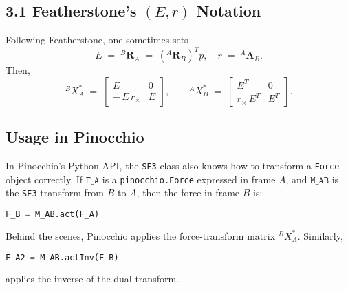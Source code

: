 \documentclass[10pt]{article}
\begin{document}
\subsection*{3.1 Featherstone's \((E,r)\) Notation}
Following Featherstone, one sometimes sets
\[
E \;=\; {}^{B}\mathbf{R}_{A} \;=\; ({}^{A}\mathbf{R}_{B})^Tp,
\quad
r \;=\; {}^{A}\mathbf{A}_{B}.
\]
Then,
\[
{}^{B}X^{*}_{A}
\;=\;
\begin{bmatrix}
E & 0 \\[3pt]
-\,E\,r_\times & E
\end{bmatrix},
\qquad
{}^{A}X^{*}_{B}
\;=\;
\begin{bmatrix}
E^T & 0\\[3pt]
r_\times\,E^T & E^T
\end{bmatrix}.
\]

\subsection*{Usage in Pinocchio}

In Pinocchio’s Python API, the \texttt{SE3} class also knows how to transform a \texttt{Force} object correctly.  If \(\texttt{F\_A}\) is a \texttt{pinocchio.Force} expressed in frame \(A\), and \(\texttt{M\_AB}\) is the \texttt{SE3} transform from \(B\) to \(A\), then the force in frame \(B\) is:

\begin{lstlisting}[language=Python]
F_B = M_AB.act(F_A)
\end{lstlisting}

Behind the scenes, Pinocchio applies the force-transform matrix \({}^B X_A^*\).  Similarly,

\begin{lstlisting}[language=Python]
F_A2 = M_AB.actInv(F_B)
\end{lstlisting}

applies the inverse of the dual transform.
\end{document}
